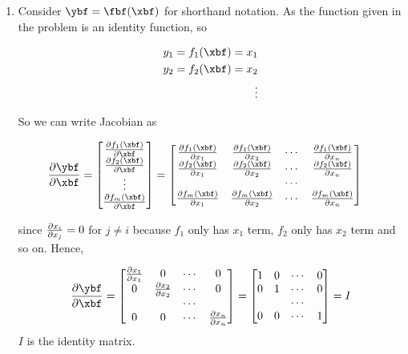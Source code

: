\documentclass[12pt, xcolor=dvipsnames,svgnames,x11names]{article}
\begin{document}
\begin{enumerate}
\item 

Consider $\ybf = \fbf(\xbf)$ for shorthand notation. As the function given in the problem is an identity function, so

\begin{align*}
y_1 = f_1(\xbf) = x_1\\
y_2 = f_2(\xbf) = x_2\\
\vdots\\
\end{align*}

So we can write Jacobian as

\begin{align*}
\pdv{\ybf}{\xbf} = \begin{bmatrix}
\pdv{f_1(\xbf)}{\xbf} \\\pdv{f_2(\xbf)}{\xbf}\\ \vdots \\ \pdv{f_m(\xbf)}{\xbf}
\end{bmatrix} & = \begin{bmatrix}
\pdv{f_1(\xbf)}{x_1} & \pdv{f_1(\xbf)}{x_2} & \cdots & \pdv{f_1(\xbf)}{x_n}\\
\pdv{f_2(\xbf)}{x_1} & \pdv{f_2(\xbf)}{x_2} & \cdots & \pdv{f_2(\xbf)}{x_n}\\
& & \cdots & \\
\pdv{f_m(\xbf)}{x_1} & \pdv{f_m(\xbf)}{x_2} & \cdots & \pdv{f_m(\xbf)}{x_n}
\end{bmatrix}
\end{align*}





since $\pdv{x_i}{x_j} = 0$ for $j \neq i$ because $f_1$ only has $x_1$ term, $f_2$ only has $x_2$ term and so on. Hence, 


\begin{align*}
\pdv{\ybf}{\xbf} = \begin{bmatrix}
\pdv{x_1}{x_1} & 0  & \cdots & 0\\
 0 & \pdv{x_2}{x_2}  & \cdots & 0\\
& & \cdots & \\
 0 & 0 & \cdots & \pdv{x_n}{x_n} 
\end{bmatrix} =  \begin{bmatrix}
1 & 0  & \cdots & 0\\
 0 & 1 & \cdots & 0\\
& & \cdots & \\
 0 & 0 & \cdots & 1
\end{bmatrix} = I
\end{align*}
$I$ is the identity matrix.



\end{enumerate}
\end{document}
